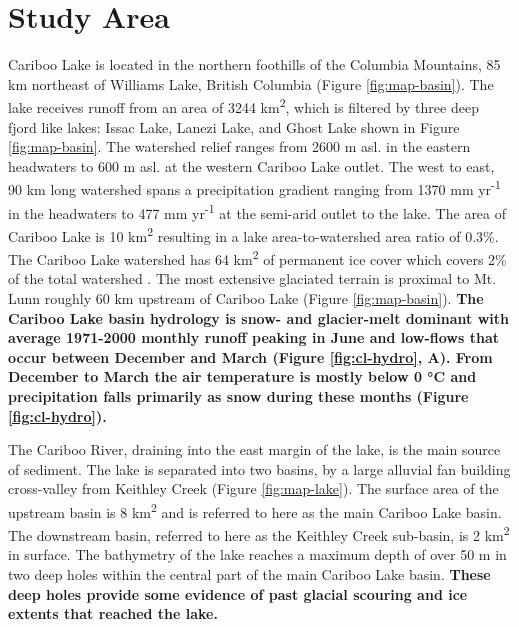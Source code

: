 \documentclass[Royal,times,doublespace,sageh]{sagej}
\begin{document}
\hypertarget{study-area}{%
\section{Study Area}\label{study-area}}

Cariboo Lake is located in the northern foothills of the Columbia
Mountains, 85 km northeast of Williams Lake, British Columbia (Figure
\ref{fig:map-basin}). The lake receives runoff from an area of 3244
km\textsuperscript{2}, which is filtered by three deep fjord like lakes:
Issac Lake, Lanezi Lake, and Ghost Lake shown in Figure
\ref{fig:map-basin}. The watershed relief ranges from 2600 m asl. in the
eastern headwaters to 600 m asl. at the western Cariboo Lake outlet. The
west to east, 90 km long watershed spans a precipitation gradient
ranging from 1370 mm yr\textsuperscript{-1} in the headwaters to 477 mm
yr\textsuperscript{-1} at the semi-arid outlet to the lake. The area of
Cariboo Lake is 10 km\textsuperscript{2} resulting in a lake
area-to-watershed area ratio of 0.3\%. The Cariboo Lake watershed has 64
km\textsuperscript{2} of permanent ice cover which covers 2\% of the
total watershed \citep{Bolch2008}. The most extensive glaciated terrain
is proximal to Mt. Lunn roughly 60 km upstream of Cariboo Lake (Figure
\ref{fig:map-basin}). \textbf{The Cariboo Lake basin hydrology is snow-
and glacier-melt dominant with average 1971-2000 monthly runoff peaking
in June and low-flows that occur between December and March (Figure
\ref{fig:cl-hydro}, A). From December to March the air temperature is
mostly below 0 °C and precipitation falls primarily as snow during these
months (Figure \ref{fig:cl-hydro}).}

The Cariboo River, draining into the east margin of the lake, is the
main source of sediment. The lake is separated into two basins, by a
large alluvial fan building cross-valley from Keithley Creek (Figure
\ref{fig:map-lake}). The surface area of the upstream basin is 8
km\textsuperscript{2} and is referred to here as the main Cariboo Lake
basin. The downstream basin, referred to here as the Keithley Creek
sub-basin, is 2 km\textsuperscript{2} in surface. The bathymetry of the
lake reaches a maximum depth of over 50 m in two deep holes within the
central part of the main Cariboo Lake basin. \textbf{These deep holes
provide some evidence of past glacial scouring and ice extents that
reached the lake.}
\end{document}
